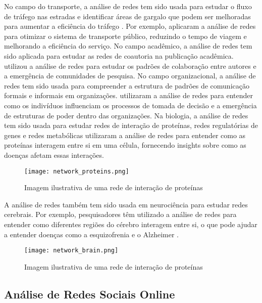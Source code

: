 No campo do transporte, a análise de redes tem sido usada para estudar o fluxo de tráfego nas estradas e identificar áreas de gargalo que podem ser melhoradas para aumentar a eficiência do tráfego \cite[]{2012_Levinson}. Por exemplo,  aplicaram a análise de redes para otimizar o sistema de transporte público, reduzindo o tempo de viagem e melhorando a eficiência do serviço. No campo acadêmico, a análise de redes tem sido aplicada para estudar as redes de coautoria na publicação acadêmica.  utilizou a análise de redes para estudar os padrões de colaboração entre autores e a emergência de comunidades de pesquisa. No campo organizacional, a análise de redes tem sido usada para compreender a estrutura de padrões de comunicação formais e informais em organizações.  utilizaram a análise de redes para entender como os indivíduos influenciam os processos de tomada de decisão e a emergência de estruturas de poder dentro das organizações. Na biologia, a análise de redes tem sido usada para estudar redes de interação de proteínas, redes regulatórias de genes e redes metabólicas  utilizaram a análise de redes para entender como as proteínas interagem entre si em uma célula, fornecendo insights sobre como as doenças afetam essas interações.
\begin{figure}[!htb]
	\caption{Imagem ilustrativa de uma rede de interação de proteínas}
	\label{fig:network_proteins}
	\centering
	\texttt{[image: network\_proteins.png]}
\end{figure}
A análise de redes também tem sido usada em neurociência para estudar redes cerebrais. Por exemplo, pesquisadores têm utilizado a análise de redes para entender como diferentes regiões do cérebro interagem entre si, o que pode ajudar a entender doenças como a esquizofrenia e o Alzheimer \cite[]{2009_Bullmore}.
\begin{figure}[!htb]
	\caption{Imagem ilustrativa de uma rede de interação de proteínas}
	\label{fig:network_brain}
	\centering
	\texttt{[image: network\_brain.png]}
\end{figure}

\subsection*{Análise de Redes Sociais Online}

